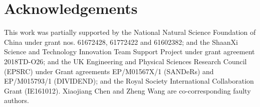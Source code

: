 \section*{Acknowledgements}
This work was partially supported by the National Natural Science Foundation of China under grant nos. 61672428, 61772422 and 61602382; and
the ShaanXi Science and Technology Innovation Team Support Project under grant agreement 2018TD-O26; and the UK Engineering and Physical
Sciences Research Council (EPSRC) under Grant agreements EP/M01567X/1 (SANDeRs) and EP/M015793/1 (DIVIDEND); and the Royal Society
International Collaboration Grant (IE161012). Xiaojiang Chen and Zheng Wang are co-corresponding faulty authors.
\newpage
